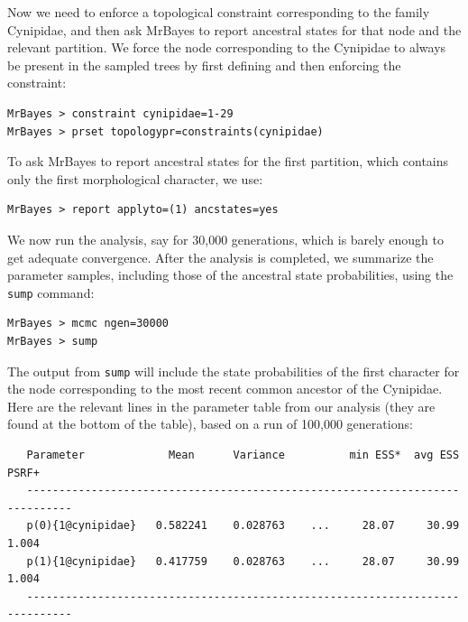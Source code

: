 \documentclass[12pt]{book}
\newcommand{\ttt}[1]{\texttt{#1} }
\begin{document}
Now we need to enforce a topological constraint corresponding to the family Cynipidae, and then ask
MrBayes to report ancestral states for that node and the relevant partition. We force the node
corresponding to the Cynipidae to always be present in the sampled trees by first defining and then
enforcing the constraint:

\begin{singlespacing}
\begin{verbatim}
MrBayes > constraint cynipidae=1-29
MrBayes > prset topologypr=constraints(cynipidae)
\end{verbatim}
\end{singlespacing}

To ask MrBayes to report ancestral states for the first partition, which contains only the first
morphological character, we use:

\begin{verbatim}
MrBayes > report applyto=(1) ancstates=yes
\end{verbatim}

We now run the analysis, say for 30,000 generations, which is barely enough to get adequate
convergence.  After the analysis is completed, we summarize the parameter samples, including those
of the ancestral state probabilities, using the \ttt{sump} command:

\begin{singlespacing}
\begin{verbatim}
MrBayes > mcmc ngen=30000
MrBayes > sump
\end{verbatim}
\end{singlespacing}

The output from \ttt{sump} will include the state probabilities of the first character for the node
corresponding to the most recent common ancestor of the Cynipidae. Here are the relevant lines in
the parameter table from our analysis (they are found at the bottom of the table), based on a run
of 100,000 generations:

\footnotesize
\begin{singlespacing}
\begin{verbatim}
   Parameter             Mean      Variance          min ESS*  avg ESS    PSRF+ 
   -----------------------------------------------------------------------------
   p(0){1@cynipidae}   0.582241    0.028763    ...     28.07     30.99    1.004
   p(1){1@cynipidae}   0.417759    0.028763    ...     28.07     30.99    1.004
   -----------------------------------------------------------------------------
\end{verbatim}
\end{singlespacing}
\normalsize
\end{document}

